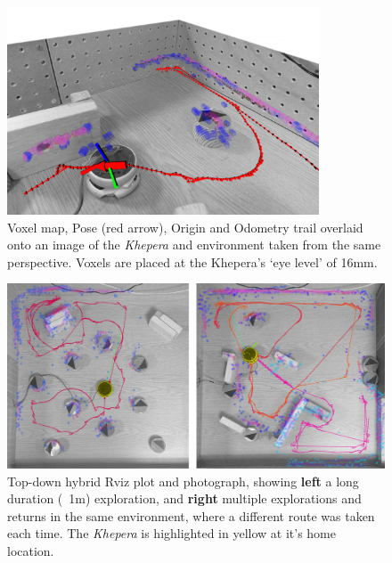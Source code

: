 \documentclass[11pt, a4paper]{article}
\begin{document}
\begin{figure}[H]
  \begin{center}
    \includegraphics[width=25em]{../assets/environments/success_2_detail_merged.png}
  \end{center}
  \caption{Voxel map, Pose (red arrow), Origin and Odometry trail overlaid onto an image of the \textit{Khepera} 
  and environment taken from the same perspective. Voxels are placed at the Khepera's `eye level' of 16mm.}
\end{figure}


\begin{figure}[H]
  \begin{center}
    \includegraphics[width=38em]{../assets/merged_top_fig.png}
  \end{center}
  \caption{Top-down hybrid Rviz plot and photograph, showing \textbf{left} a long duration (~1m)
    exploration, and \textbf{right} multiple explorations and returns in the same environment, where a
    different route was taken each time. The \textit{Khepera} is highlighted in yellow at it's home location.}
\end{figure}


\end{document}
